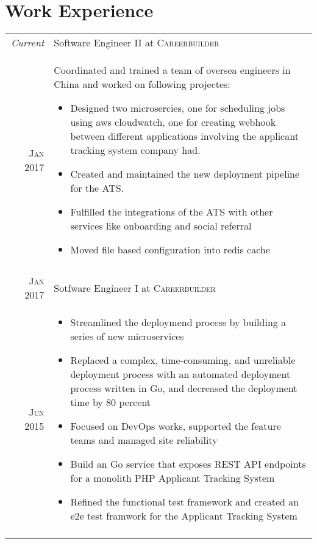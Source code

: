 \documentclass[a4paper,10pt]{article}
\begin{document}
\section{Work Experience}
\begin{tabular}{r|p{11cm}}
 \emph{Current} & Software Engineer II at \textsc{Careerbuilder} \\
 \textsc{Jan 2017} &
 \footnotesize{Coordinated and trained a team of oversea engineers in China and worked on following projectes:}
 \begin{itemize}
  \item \footnotesize{Designed two microsercies, one for scheduling jobs using aws cloudwatch, one for creating webhook between different applications involving the applicant tracking system company had.}
  \item \footnotesize{Created and maintained the new deployment pipeline for the ATS.}
  \item \footnotesize{Fulfilled the integrations of the ATS with other services like onboarding and social referral}
  \item \footnotesize{Moved file based configuration into redis cache}
 \end{itemize}
 \\
 \multicolumn{2}{c}{} \\
 \textsc{Jan 2017} & Sotfware Engineer I at \textsc{Careerbuilder} \\
 \textsc{Jun 2015} &
 \begin{itemize}
   \item \footnotesize{Streamlined the deploymend process by building a series of new microservices}
   \item \footnotesize{Replaced a complex, time-consuming, and unreliable deployment process with an automated deployment process written in Go, and decreased the deployment time by 80 percent}
   \item \footnotesize{Focused on DevOps works, supported the feature teams and managed site reliability}
   \item \footnotesize{Build an Go service that exposes REST API endpoints for a monolith PHP Applicant Tracking System}
   \item \footnotesize{Refined the functional test framework and created an e2e test framwork for the Applicant Tracking System}
 \end{itemize}
 \\
 \multicolumn{2}{c}{} \\
\end{tabular}
\end{document}
